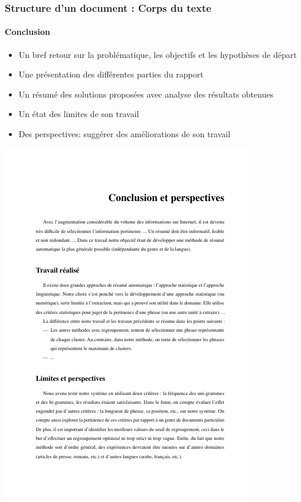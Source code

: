 \documentclass[xcolor=table]{beamer}
\begin{document}
\begin{frame}
\frametitle{Structure d'un document : Corps du texte}
\framesubtitle{Conclusion}

\begin{minipage}{0.60\textwidth}
	\begin{itemize}
		\item Un bref retour sur la problématique, les objectifs et les hypothèses de départ
		\item Une présentation des différentes parties du rapport
		\item Un résumé des solutions proposées avec analyse des résultats obtenues
		\item Un état des limites de son travail 
		\item Des perspectives: suggérer des améliorations de son travail
	\end{itemize}
\end{minipage}
\begin{minipage}{0.38\textwidth}
	\includegraphics[width=\textwidth,frame]{..//img/Bweb03-redaction/conclusion.png}
\end{minipage}

\end{frame}
\end{document}
